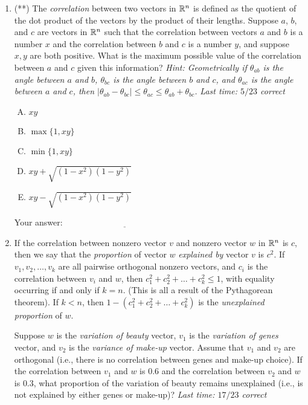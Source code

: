 \documentclass[10pt]{amsart}
\begin{document}
\begin{enumerate}
\item (**) The {\em correlation} between two vectors in $\mathbb{R}^n$ is
  defined as the quotient of the dot product of the vectors by the
  product of their lengths. Suppose $a$, $b$, and $c$ are vectors in
  $\mathbb{R}^n$ such that the correlation between vectors $a$ and $b$ is a
  number $x$ and the correlation between $b$ and $c$ is a number $y$,
  and suppose $x,y$ are both positive. What is the maximum possible
  value of the correlation between $a$ and $c$ given this information?
  {\em Hint: Geometrically if $\theta_{ab}$ is the angle between $a$
  and $b$, $\theta_{bc}$ is the angle between $b$ and $c$, and
  $\theta_{ac}$ is the angle between $a$ and $c$, then $|\theta_{ab} -
  \theta_{bc}| \le \theta_{ac} \le \theta_{ab} + \theta_{bc}$.}  {\em
  Last time: $5/23$ correct}

  \begin{enumerate}[(A)]
  \item $xy$
  \item $\max \{ 1, xy \}$
  \item $\min \{ 1, xy \}$
  \item $xy + \sqrt{(1 - x^2)(1 - y^2)}$
  \item $xy - \sqrt{(1 - x^2)(1 - y^2)}$
  \end{enumerate}

  \vspace{0.1in}
  Your answer: $\underline{\qquad\qquad\qquad\qquad\qquad\qquad\qquad}$
  \vspace{0.6in}

\item If the correlation between nonzero vector $v$ and nonzero vector
  $w$ in $\mathbb{R}^n$ is $c$, then we say that the {\em proportion} of
  vector $w$ {\em explained by} vector $v$ is $c^2$. If $v_1, v_2,
  \dots, v_k$ are all pairwise orthogonal nonzero vectors, and $c_i$
  is the correlation between $v_i$ and $w$, then $c_1^2 + c_2^2 +
  \dots + c_k^2 \le 1$, with equality occurring if and only if $k =
  n$. (This is all a result of the Pythagorean theorem). If $k < n$,
  then $1 - (c_1^2 + c_2^2 + \dots + c_k^2)$ is the {\em unexplained
    proportion} of $w$.

  Suppose $w$ is the {\em variation of beauty} vector, $v_1$ is the
  {\em variation of genes} vector, and $v_2$ is the {\em variance of
  make-up} vector. Assume that $v_1$ and $v_2$ are orthogonal (i.e.,
  there is no correlation between genes and make-up choice). If the
  correlation between $v_1$ and $w$ is $0.6$ and the correlation
  between $v_2$ and $w$ is $0.3$, what proportion of the variation of
  beauty remains unexplained (i.e., is not explained by either genes
  or make-up)? {\em Last time: $17/23$ correct}


\end{enumerate}
\end{document}
